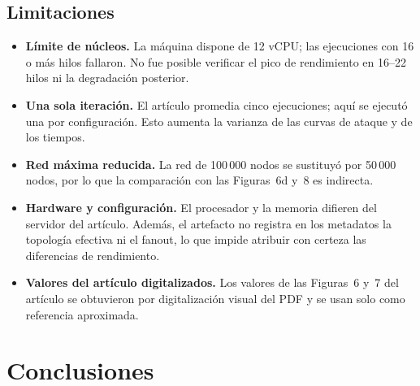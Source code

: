 \documentclass[11pt,a4paper,oneside]{article}
\begin{document}
\subsection{Limitaciones}

\begin{itemize}[leftmargin=1.2em, itemsep=2pt, topsep=3pt]
  \item \textbf{Límite de núcleos.} La máquina dispone de 12 vCPU; las ejecuciones con 16 o más hilos fallaron. No fue posible verificar el pico de rendimiento en 16--22 hilos ni la degradación posterior.
  \item \textbf{Una sola iteración.} El artículo promedia cinco ejecuciones; aquí se ejecutó una por configuración. Esto aumenta la varianza de las curvas de ataque y de los tiempos.
  \item \textbf{Red máxima reducida.} La red de 100\,000 nodos se sustituyó por 50\,000 nodos, por lo que la comparación con las Figuras~6d y~8 es indirecta.
  \item \textbf{Hardware y configuración.} El procesador y la memoria difieren del servidor del artículo. Además, el artefacto no registra en los metadatos la topología efectiva ni el fanout, lo que impide atribuir con certeza las diferencias de rendimiento.
  \item \textbf{Valores del artículo digitalizados.} Los valores de las Figuras~6 y~7 del artículo se obtuvieron por digitalización visual del PDF y se usan solo como referencia aproximada.
\end{itemize}

\section{Conclusiones}
\label{sec:conclusiones}
\end{document}
